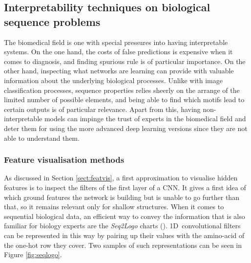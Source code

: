 
\subsection{Interpretability techniques on biological sequence problems}
The biomedical field is one with special pressures into having interpretable systems. On the one hand, the costs of false predictions is expensive when it comes to diagnosis, and finding spurious rule is of particular importance. On the other hand, inspecting what networks are learning can provide with valuable information about the underlying biological processes. Unlike with image classification processes, sequence properties relies sheerly on the arrange of the limited number of possible elements, and being able to find which motifs lead to certain outputs is of particular relevance. Apart from this, having non-interpretable models can impinge the trust of experts in the biomedical field and deter them for using the more advanced deep learning versions since they are not able to understand them.

\subsubsection*{Feature visualisation methods}
As discussed in Section \ref{sect:featvis}, a first approximation to visualise hidden features is to inspect the filters of the first layer of a CNN. It gives a first idea of which ground features the network is building but is unable to go further than that, so it remains relevant only for shallow structures. When it comes to sequential biological data, an efficient way to convey the information that is also familiar for biology experts are the \textit{Seq2Logo} charts (\cite{Thomsen2012}). 1D~convolutional filters can be represented in this way by pairing up their values with the amino-acid of the one-hot row they cover. Two samples of such representations can be seen in Figure \ref{fig:seqlogo}.

